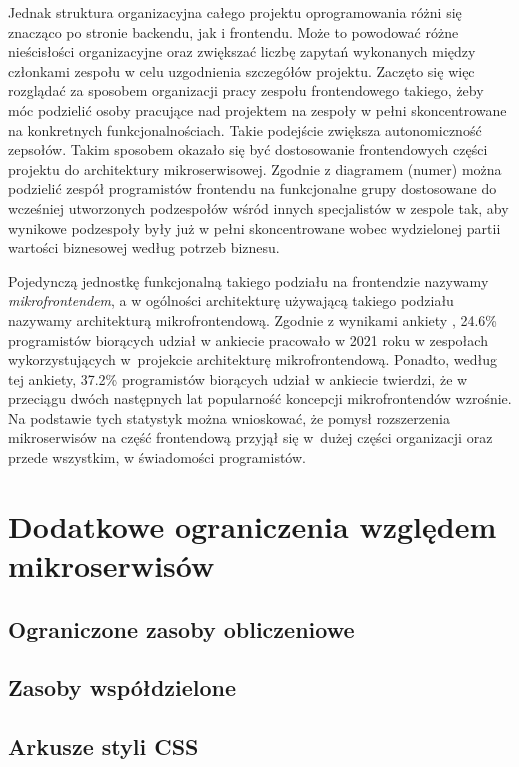 \documentclass{SGGW-thesis}
\begin{document}
  Jednak struktura organizacyjna całego projektu oprogramowania różni się znacząco po stronie backendu, jak i frontendu. Może to powodować różne nieścisłości organizacyjne oraz zwiększać liczbę zapytań wykonanych między członkami zespołu w celu uzgodnienia szczegółów projektu. Zaczęto się więc rozglądać za sposobem organizacji pracy zespołu frontendowego takiego, żeby móc podzielić osoby pracujące nad projektem na zespoły w pełni skoncentrowane na konkretnych funkcjonalnościach. Takie podejście zwiększa autonomiczność zepsołów.
  Takim sposobem okazało się być dostosowanie frontendowych części projektu do architektury mikroserwisowej. Zgodnie z diagramem (numer) można podzielić zespół programistów frontendu na funkcjonalne grupy dostosowane do wcześniej utworzonych podzespołów wśród innych specjalistów w zespole tak, aby wynikowe podzespoły były już w pełni skoncentrowane wobec wydzielonej partii wartości biznesowej według potrzeb biznesu. 
  
  
  Pojedynczą jednostkę funkcjonalną takiego podziału na frontendzie nazywamy \textit{mikrofrontendem}, a w ogólności architekturę używającą takiego podziału nazywamy architekturą mikrofrontendową.
  Zgodnie z wynikami ankiety \cite{tsh_2022}, 24.6\% programistów biorących udział w ankiecie pracowało w 2021 roku w zespołach wykorzystujących w~projekcie architekturę mikrofrontendową. Ponadto, według tej ankiety, 37.2\% programistów biorących udział w ankiecie twierdzi, że w przeciągu dwóch następnych lat popularność koncepcji mikrofrontendów wzrośnie. Na podstawie tych statystyk można wnioskować, że pomysł rozszerzenia mikroserwisów na część frontendową przyjął się w~dużej części organizacji oraz przede wszystkim, w świadomości programistów.

  \section{Dodatkowe ograniczenia względem mikroserwisów}


    \subsection{Ograniczone zasoby obliczeniowe}
    \subsection{Zasoby współdzielone}
    \subsection{Arkusze styli CSS}
\end{document}
